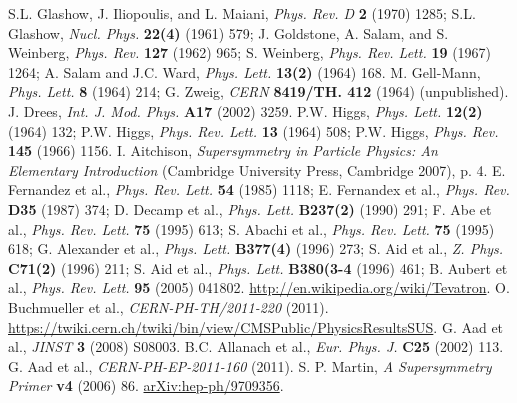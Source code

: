 \documentclass[12pt, letterpaper]{report}
\begin{document}
\begin{thebibliography}{99}
 S.L. Glashow, J. Iliopoulis, and L. Maiani, \textit{Phys. Rev. D} \textbf{2} (1970) 1285; S.L. Glashow, \textit{Nucl. Phys.} \textbf{22(4)} (1961) 579; J. Goldstone, A. Salam, and S. Weinberg, \textit{Phys. Rev.} \textbf{127} (1962) 965; S. Weinberg, \textit{Phys. Rev. Lett.} \textbf{19} (1967) 1264; A. Salam and J.C. Ward, \textit{Phys. Lett.} \textbf{13(2)} (1964) 168.
 M. Gell-Mann, \textit{Phys. Lett.} \textbf{8} (1964) 214; G. Zweig, \textit{CERN} \textbf{8419/TH. 412} (1964) (unpublished).
 J. Drees, \textit{Int. J. Mod. Phys.} \textbf{A17} (2002) 3259.
 P.W. Higgs, \textit{Phys. Lett.} \textbf{12(2)} (1964) 132; P.W. Higgs, \textit{Phys. Rev. Lett.} \textbf{13} (1964) 508; P.W. Higgs, \textit{Phys. Rev.} \textbf{145} (1966) 1156.
 I. Aitchison, \textit{Supersymmetry in Particle Physics: An Elementary Introduction} (Cambridge University Press, Cambridge 2007), p. 4.
 E. Fernandez et al., \textit{Phys. Rev. Lett.} \textbf{54} (1985) 1118; E. Fernandex et al., \textit{Phys. Rev.} \textbf{D35} (1987) 374; D. Decamp et al., \textit{Phys. Lett.} \textbf{B237(2)} (1990) 291; F. Abe et al., \textit{Phys. Rev. Lett.} \textbf{75} (1995) 613; S. Abachi et al., \textit{Phys. Rev. Lett.} \textbf{75} (1995) 618; G. Alexander et al., \textit{Phys. Lett.} \textbf{B377(4)} (1996) 273; S. Aid et al., \textit{Z. Phys.} \textbf{C71(2)} (1996) 211; S. Aid et al., \textit{Phys. Lett.} \textbf{B380(3-4} (1996) 461; B. Aubert et al., \textit{Phys. Rev. Lett.} \textbf{95} (2005) 041802.
 \url{http://en.wikipedia.org/wiki/Tevatron}.
 O. Buchmueller et al., \textit{CERN-PH-TH/2011-220} (2011).
 \url{https://twiki.cern.ch/twiki/bin/view/CMSPublic/PhysicsResultsSUS}.
 G. Aad et al., \textit{JINST} \textbf{3} (2008) S08003.
 B.C. Allanach et al., \textit{Eur. Phys. J.} \textbf{C25} (2002) 113.
 G. Aad et al., \textit{CERN-PH-EP-2011-160} (2011).
 S. P. Martin, \textit{A Supersymmetry Primer} \textbf{v4} (2006) 86.  \href{http://arxiv.org/abs/hep-ph/9709356}{arXiv:hep-ph/9709356}.
\end{thebibliography}
\end{document}

